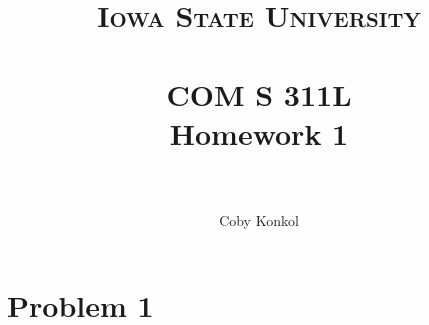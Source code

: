 \documentclass{article}
\title{	
\normalfont \normalsize 
\textsc{Iowa State University} \\ [25pt] %
\horrule{0.5pt} \\[0.4cm] %
\huge COM S 311L \\ Homework 1 \\ %
\horrule{2pt} \\[0.5cm] %
}
\author{Coby Konkol}
\numberwithin{equation}{section} %
\numberwithin{figure}{section} %
\numberwithin{table}{section} %
\begin{document}
\maketitle



\section{Problem 1}

\end{document}
